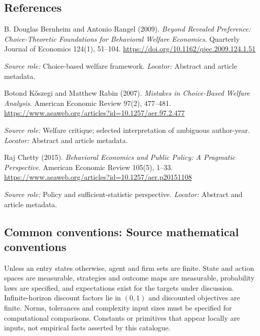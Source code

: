 \documentclass[11pt,a4paper]{article}
\begin{document}
\subsection*{References}

\begin{enumerate}[label={[S\arabic*]},leftmargin=*]

\item B. Douglas Bernheim and Antonio Rangel (2009). \emph{Beyond Revealed Preference: Choice-Theoretic Foundations for Behavioral Welfare Economics}. Quarterly Journal of Economics 124(1), 51--104. \url{https://doi.org/10.1162/qjec.2009.124.1.51}\par \textit{Source role:} Choice-based welfare framework. \textit{Locator:} Abstract and article metadata.

\item Botond Kőszegi and Matthew Rabin (2007). \emph{Mistakes in Choice-Based Welfare Analysis}. American Economic Review 97(2), 477--481. \url{https://www.aeaweb.org/articles?id=10.1257/aer.97.2.477}\par \textit{Source role:} Welfare critique; selected interpretation of ambiguous author-year. \textit{Locator:} Abstract and article metadata.

\item Raj Chetty (2015). \emph{Behavioral Economics and Public Policy: A Pragmatic Perspective}. American Economic Review 105(5), 1--33. \url{https://www.aeaweb.org/articles?id=10.1257/aer.p20151108}\par \textit{Source role:} Policy and sufficient-statistic perspective. \textit{Locator:} Abstract and article metadata.

\end{enumerate}

\subsection*{Common conventions: Source mathematical conventions}

Unless an entry states otherwise, agent and firm sets are finite. State and action spaces are measurable, strategies and outcome maps are measurable, probability laws are specified, and expectations exist for the targets under discussion. Infinite-horizon discount factors lie in $(0,1)$ and discounted objectives are finite. Norms, tolerances and complexity input sizes must be specified for computational comparisons. Constants or primitives that appear locally are inputs, not empirical facts asserted by this catalogue.
\end{document}
